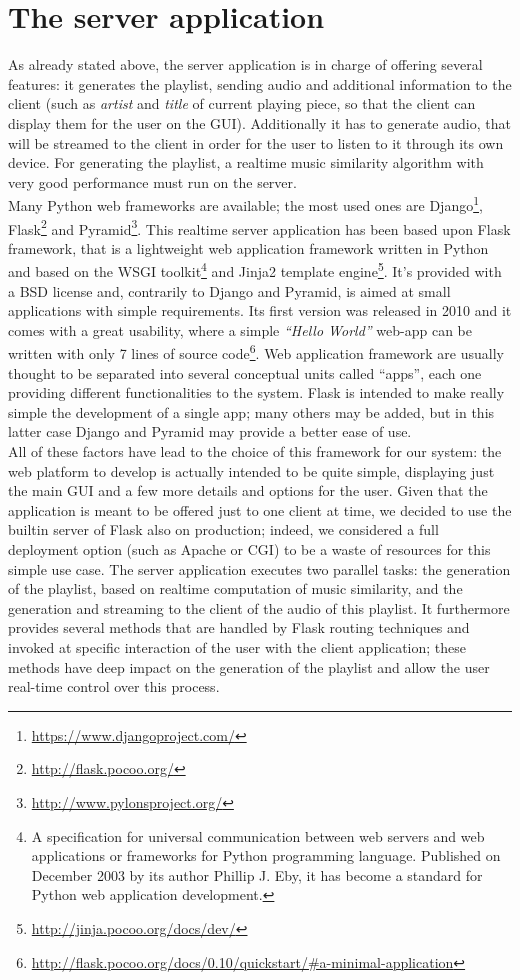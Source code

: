 \section{The server application}
\label{sec:rtserver}
As already stated above, the server application is in charge of offering several features: it generates the playlist, sending audio and additional information to the client (such as \textit{artist} and \textit{title} of current playing piece, so that the client can display them for the user on the GUI). Additionally it has to generate audio, that will be streamed to the client in order for the user to listen to it through its own device. For generating the playlist, a realtime music similarity algorithm with very good performance must run on the server. \\ Many Python web frameworks are available; the most used ones are Django\footnote{\url{https://www.djangoproject.com/}}, Flask\footnote{\url{http://flask.pocoo.org/}} and Pyramid\footnote{\url{http://www.pylonsproject.org/}}. This realtime server application has been based upon Flask framework, that is a lightweight web application framework written in Python and based on the WSGI toolkit\footnote{A specification for universal communication between web servers and web applications or frameworks for Python programming language. Published on December 2003 by its author Phillip J. Eby, it has become a standard for Python web application development.} and Jinja2 template engine\footnote{\url{http://jinja.pocoo.org/docs/dev/}}. It's provided with a BSD license and, contrarily to Django and Pyramid, is aimed at small applications with simple requirements. Its first version was released in 2010 and it comes with a great usability, where a simple \textit{``Hello World''} web-app can be written with only 7 lines of source code\footnote{\url{http://flask.pocoo.org/docs/0.10/quickstart/#a-minimal-application}}. Web application framework are usually thought to be separated into several conceptual units called ``apps'', each one providing different functionalities to the system. Flask is intended to make really simple the development of a single app; many others may be added, but in this latter case Django and Pyramid may provide a better ease of use. \\ All of these factors have lead to the choice of this framework for our system: the web platform to develop is actually intended to be quite simple, displaying just the main GUI and a few more details and options for the user. Given that the application is meant to be offered just to one client at time, we decided to use the builtin server of Flask also on production; indeed, we considered a full deployment option (such as Apache or CGI) to be a waste of resources for this simple use case. The server application executes two parallel tasks: the generation of the playlist, based on realtime computation of music similarity, and the generation and streaming to the client of the audio of this playlist. It furthermore provides several methods that are handled by Flask routing techniques and invoked at specific interaction of the user with the client application; these methods have deep impact on the generation of the playlist and allow the user real-time control over this process. 

